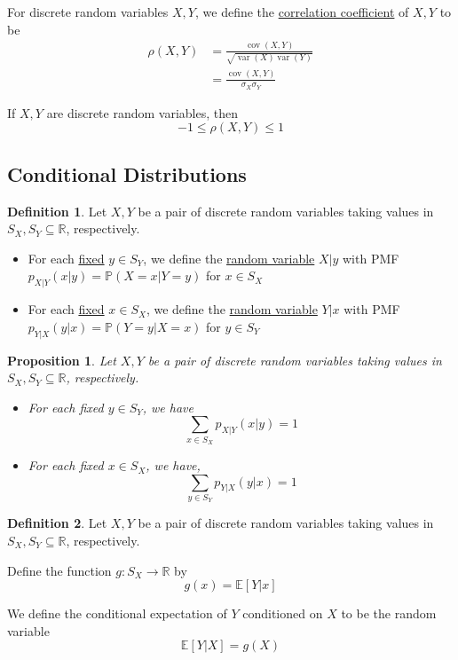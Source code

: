 \documentclass[
]{article}
\newtheorem{proposition}{Proposition}[section]
\theoremstyle{definition}
\newtheorem{definition}{Definition}[section]
\theoremstyle{definition}
\theoremstyle{definition}
\theoremstyle{remark}
\newcommand{\prob}[1]{\mathbb{P}\left(#1\right)}
\newcommand{\E}[1]{\mathbb{E}[#1]}
\newcommand{\covxy}{\operatorname{cov}(X,Y)}
\newcommand{\varx}{\operatorname{var}(X)}
\newcommand{\var}[1]{\operatorname{var}\left(#1\right)}
\begin{document}
For discrete random variables $X,Y$, we define the \underline{correlation coefficient} of $X,Y$ to be
\begin{align*}
  \rho(X,Y) & =\frac{\covxy}{\sqrt{\varx\var{Y}}} \\
            & =\frac{\covxy}{\sigma_X\sigma_Y}
\end{align*}

If $X,Y$ are discrete random variables, then
\[-1\leq\rho(X,Y)\leq 1\]

\subsection{Conditional Distributions}

\begin{definition}
  Let $X, Y$ be a pair of discrete random variables taking values in $S_X, S_Y \subseteq \mathbb{R}$, respectively.
  \begin{itemize}
    \item For each \underline{fixed} $y \in S_Y$, we define the \underline{random variable} $X|y$ with PMF $p_{X|Y}(x|y) = \prob{X = x| Y = y} $ for $x \in S_X$
    \item For each \underline{fixed} $x \in S_X$, we define the \underline{random variable} $Y|x$ with PMF $p_{Y|X}(y|x) = \prob{Y = y|X=x} $ for $y \in S_Y$
  \end{itemize}
\end{definition}

\begin{proposition}
  Let $X, Y$ be a pair of discrete random variables taking values in $S_X, S_Y \subseteq \mathbb{R}$, respectively.
  \begin{itemize}
    \item For each fixed $y \in S_Y$, we have
          \[\sum_{x \in S_X} p_{X|Y}(x|y) = 1\]
    \item For each fixed $x \in S_X$, we have,
          \[\sum_{y \in S_Y} p_{Y|X}(y|x) = 1\]
  \end{itemize}
\end{proposition}

\begin{definition}
  Let $X, Y$ be a pair of discrete random variables taking values in $S_X, S_Y \subseteq \mathbb{R}$, respectively.
  \item Define the function $g:S_X \rightarrow \mathbb{R}$ by \[g(x) = \E{Y|x}\]
  \item We define the conditional expectation of $Y$ conditioned on $X$ to be the random variable \[\E{Y|X} = g(X)\]
\end{definition}
\end{document}
